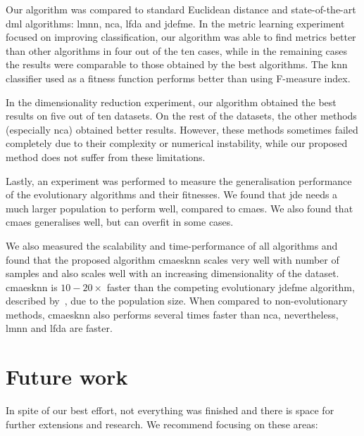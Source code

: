 Our algorithm was compared to standard Euclidean distance and state-of-the-art \ac{dml} algorithms: \ac{lmnn}, \ac{nca}, \ac{lfda} and \ac{jdefme}. In the metric learning experiment focused on improving classification, our algorithm was able to find metrics better than other algorithms in four out of the ten cases, while in the remaining cases the results were comparable to those obtained by the best algorithms. The \ac{knn} classifier used as a fitness function performs better than using \mbox{F-measure} index.

In the dimensionality reduction experiment, our algorithm obtained the best results on five out of ten datasets. On the rest of the datasets, the other methods (especially \ac{nca}) obtained better results. However, these methods sometimes failed completely due to their complexity or numerical instability, while our proposed method does not suffer from these limitations.

Lastly, an experiment was performed to measure the generalisation performance of the evolutionary algorithms and their fitnesses. We found that \ac{jde} needs a much larger population to perform well, compared to \ac{cmaes}. We also found that \ac{cmaes} generalises well, but can overfit in some cases. 

We also measured the scalability and time-performance of all algorithms and found that the proposed algorithm \ac{cmaesknn} scales very well with number of samples and also scales well with an increasing dimensionality of the dataset. \ac{cmaesknn} is $10-20\times$ faster than the competing evolutionary \ac{jdefme} algorithm, described by~\citep{fukui2013evolutionary}, due to the population size. When compared to non-evolutionary methods, \ac{cmaesknn} also performs several times faster than \ac{nca}, nevertheless, \ac{lmnn} and \ac{lfda} are faster.


\chapter{Future work} \label{chap:future-work}


In spite of our best effort, not everything was finished and there is space for further extensions and research. We recommend focusing on these areas:

